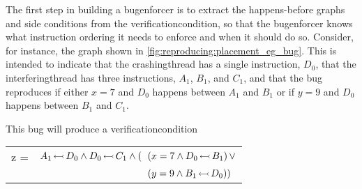 \begin{wrapfigure}{o}{5.2cm}
  \vspace{-12pt}
  \begin{figgure}
  \caption{}
  \label{fig:reproducing:placement_eg_bug}
  \end{figgure}
  \vspace{-12pt}
\end{wrapfigure}
\noindent The first step in building a \gls{bugenforcer} is to extract
the happens-before graphs and \glspl{side condition} from the
\gls{verificationcondition}, so that the \gls{bugenforcer} knows what
instruction ordering it needs to enforce and when it should do so.
Consider, for instance, the graph shown in
\autoref{fig:reproducing:placement_eg_bug}.  This is intended to
indicate that the \gls{crashingthread} has a single instruction,
$D_0$, that the \gls{interferingthread} has three instructions, $A_1$,
$B_1$, and $C_1$, and that the bug reproduces if either $x = 7$ and
$D_0$ happens between $A_1$ and $B_1$ or if $y = 9$ and $D_0$ happens
between $B_1$ and $C_1$.

This bug will produce a \gls{verificationcondition}

\noindent
{\hfill}
\begin{tabular}{lll}
z = & $A_1\,{\leftarrowtail}\,D_0 \wedge D_0\,{\leftarrowtail}\,C_1 \wedge (\!\!\!\!$ & $(x = 7 \wedge D_0\,{\leftarrowtail}\,B_1)\,\vee$ \\
    &                                                                            & $(y = 9 \wedge B_1\,{\leftarrowtail}\,D_0))$
\end{tabular}
{\hfill}

